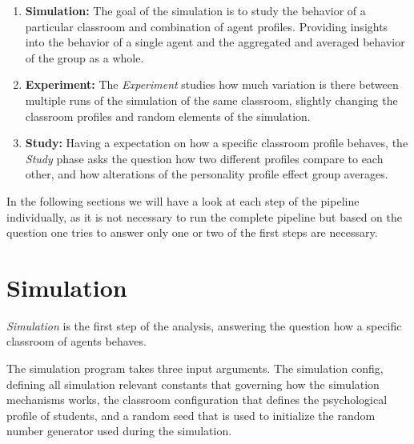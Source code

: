 \begin{enumerate}
    \item \textbf{Simulation:} The goal of the simulation is to study the behavior
    of a particular classroom and combination of agent profiles. Providing insights
    into the behavior of a single agent and the aggregated and averaged behavior of
    the group as a whole.
    \item \textbf{Experiment:} The \textit{Experiment} studies how much variation
    is there between multiple runs of the simulation of the same classroom,
    slightly changing the classroom profiles and random elements of the simulation.
    \item \textbf{Study:} Having a expectation on how a specific classroom profile
    behaves, the \textit{Study} phase asks the question how two different profiles
    compare to each other, and how alterations of the personality profile effect
    group averages.
\end{enumerate}

In the following sections we will have a look at each step of the pipeline individually,
as it is not necessary to run the complete pipeline but based on the question
one tries to answer only one or two of the first steps are necessary.


\section{Simulation}

\begin{figure}[!h]
    \hspace*{-2.0\leftmargin}
\end{figure}

\textit{Simulation} is the first step of the analysis, answering the question how
a specific classroom of agents behaves.

The simulation program takes three input arguments. The simulation config,
defining all simulation relevant constants that governing how the simulation mechanisms
works, the classroom configuration that defines the psychological profile of students,
and a random seed that is used to initialize the random number generator used during
the simulation.


